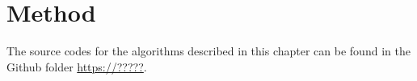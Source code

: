 \chapter{Method}
\label{chap:method} 
The source codes for the algorithms described in this chapter can be found in the Github folder \url{https://?????}.  

